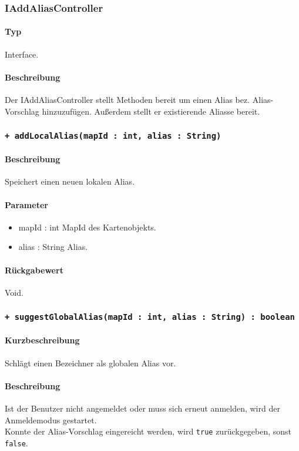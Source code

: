 \subsubsection{IAddAliasController}
\paragraph*{Typ}
Interface.
\paragraph*{Beschreibung}
Der IAddAliasController stellt Methoden bereit um einen Alias bez. Alias-Vorschlag hinzuzufügen. 
Außerdem stellt er existierende Aliasse bereit.

\subsubsection*{\texttt{+ addLocalAlias(mapId : int, alias : String)}}%
\paragraph*{Beschreibung}
Speichert einen neuen lokalen Alias.
\paragraph*{Parameter}
\begin{itemize}
    \item mapId : int MapId des Kartenobjekts.
    \item alias : String Alias.
\end{itemize}
\paragraph*{Rückgabewert}
Void.

\subsubsection*{\texttt{+ suggestGlobalAlias(mapId : int, alias : String) : boolean}}%
\paragraph*{Kurzbeschreibung}
Schlägt einen Bezeichner als globalen Alias vor.
\paragraph*{Beschreibung}
Ist der Benutzer nicht angemeldet oder muss sich erneut anmelden, wird der Anmeldemodus gestartet.\\
Konnte der Alias-Vorschlag eingereicht werden, wird \texttt{true} zurückgegeben, sonst \texttt{false}.
